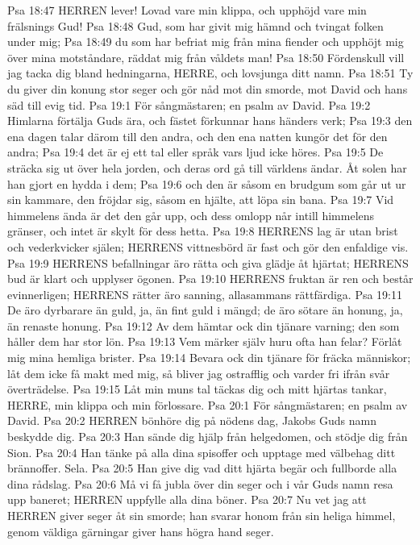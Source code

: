 Psa 18:47  HERREN lever! Lovad vare min klippa, och upphöjd vare min frälsnings Gud!
Psa 18:48  Gud, som har givit mig hämnd och tvingat folken under mig;
Psa 18:49  du som har befriat mig från mina fiender och upphöjt mig över mina motståndare, räddat mig från våldets man!
Psa 18:50  Fördenskull vill jag tacka dig bland hedningarna, HERRE, och lovsjunga ditt namn.
Psa 18:51  Ty du giver din konung stor seger och gör nåd mot din smorde, mot David och hans säd till evig tid.
Psa 19:1  För sångmästaren; en psalm av David.
Psa 19:2  Himlarna förtälja Guds ära, och fästet förkunnar hans händers verk;
Psa 19:3  den ena dagen talar därom till den andra, och den ena natten kungör det för den andra;
Psa 19:4  det är ej ett tal eller språk vars ljud icke höres.
Psa 19:5  De sträcka sig ut över hela jorden, och deras ord gå till världens ändar. Åt solen har han gjort en hydda i dem;
Psa 19:6  och den är såsom en brudgum som går ut ur sin kammare, den fröjdar sig, såsom en hjälte, att löpa sin bana.
Psa 19:7  Vid himmelens ända är det den går upp, och dess omlopp når intill himmelens gränser, och intet är skylt för dess hetta.
Psa 19:8  HERRENS lag är utan brist och vederkvicker själen; HERRENS vittnesbörd är fast och gör den enfaldige vis.
Psa 19:9  HERRENS befallningar äro rätta och giva glädje åt hjärtat; HERRENS bud är klart och upplyser ögonen.
Psa 19:10  HERRENS fruktan är ren och består evinnerligen; HERRENS rätter äro sanning, allasammans rättfärdiga.
Psa 19:11  De äro dyrbarare än guld, ja, än fint guld i mängd; de äro sötare än honung, ja, än renaste honung.
Psa 19:12  Av dem hämtar ock din tjänare varning; den som håller dem har stor lön.
Psa 19:13  Vem märker själv huru ofta han felar? Förlåt mig mina hemliga brister.
Psa 19:14  Bevara ock din tjänare för fräcka människor; låt dem icke få makt med mig, så bliver jag ostrafflig och varder fri ifrån svår överträdelse.
Psa 19:15  Låt min muns tal täckas dig och mitt hjärtas tankar, HERRE, min klippa och min förlossare.
Psa 20:1  För sångmästaren; en psalm av David.
Psa 20:2  HERREN bönhöre dig på nödens dag, Jakobs Guds namn beskydde dig.
Psa 20:3  Han sände dig hjälp från helgedomen, och stödje dig från Sion.
Psa 20:4  Han tänke på alla dina spisoffer och upptage med välbehag ditt brännoffer. Sela.
Psa 20:5  Han give dig vad ditt hjärta begär och fullborde alla dina rådslag.
Psa 20:6  Må vi få jubla över din seger och i vår Guds namn resa upp baneret; HERREN uppfylle alla dina böner.
Psa 20:7  Nu vet jag att HERREN giver seger åt sin smorde; han svarar honom från sin heliga himmel, genom väldiga gärningar giver hans högra hand seger.
